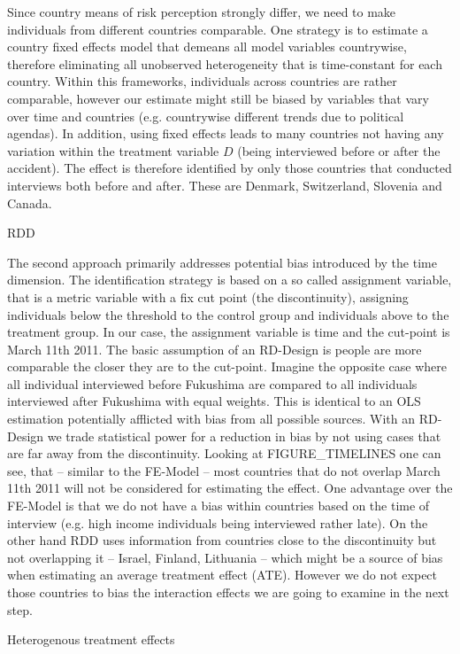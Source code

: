 {Since country means of risk perception strongly differ, we need to make individuals from different countries comparable. One strategy is to estimate a country fixed effects model that demeans all model variables countrywise, therefore eliminating all unobserved heterogeneity that is time-constant for each country. Within this frameworks, individuals across countries are rather comparable, however our estimate might still be biased by variables that vary over time and countries (e.g. countrywise different trends due to political agendas). In addition, using fixed effects leads to many countries not having any variation within the treatment variable $D$ (being interviewed before or after the accident). The effect is therefore identified by only those countries that conducted interviews both before and after. These are Denmark, Switzerland, Slovenia and Canada. 

RDD

The second approach primarily addresses potential bias introduced by the time dimension. The identification strategy is based on a so called assignment variable, that is a metric variable with a fix cut point (the discontinuity), assigning individuals below the threshold to the control group and individuals above to the treatment group. In our case, the assignment variable is time and the cut-point is March 11th 2011. The basic assumption of an RD-Design is people are more comparable the closer they are to the cut-point. Imagine the opposite case where all individual interviewed before Fukushima are compared to all individuals interviewed after Fukushima with equal weights. This is identical to an OLS estimation potentially afflicted with bias from all possible sources. With an RD-Design we trade statistical power for a reduction in bias by not using cases that are far away from the discontinuity. Looking at FIGURE_TIMELINES one can see, that -- similar to the FE-Model -- most countries that do not overlap March 11th 2011 will not be considered for estimating the effect. One advantage over the FE-Model is that we do not have a bias within countries based on the time of interview (e.g. high income individuals being interviewed rather late). On the other hand RDD uses information from countries close to the discontinuity but not overlapping it -- Israel, Finland, Lithuania -- which might be a source of bias when estimating an average treatment effect (ATE). However we do not expect those countries to bias the interaction effects we are going to examine in the next step.

Heterogenous treatment effects

}
